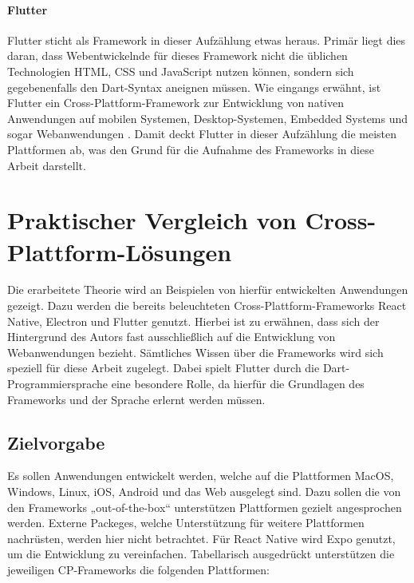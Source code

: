 \documentclass[a4paper]{scrartcl}
\begin{document}
\paragraph{Flutter}

Flutter sticht als Framework in dieser Aufzählung etwas heraus. Primär liegt dies daran, dass Webentwickelnde für dieses Framework nicht die üblichen Technologien HTML, CSS und JavaScript nutzen können, sondern sich gegebenenfalls den Dart-Syntax aneignen müssen. Wie eingangs erwähnt, ist Flutter ein Cross-Plattform-Framework zur Entwicklung von nativen Anwendungen auf mobilen Systemen, Desktop-Systemen, Embedded Systems und sogar Webanwendungen \autocite{Flutter}. Damit deckt Flutter in dieser Aufzählung die meisten Plattformen ab, was den Grund für die Aufnahme des Frameworks in diese Arbeit darstellt.

\newpage

\section{Praktischer Vergleich von Cross-Plattform-Lösungen}

Die erarbeitete Theorie wird an Beispielen von hierfür entwickelten Anwendungen gezeigt. Dazu werden die bereits beleuchteten Cross-Plattform-Frameworks React Native, Electron und Flutter genutzt. Hierbei ist zu erwähnen, dass sich der Hintergrund des Autors fast ausschließlich auf die Entwicklung von Webanwendungen bezieht. Sämtliches Wissen über die Frameworks wird sich speziell für diese Arbeit zugelegt. Dabei spielt Flutter durch die Dart-Programmiersprache eine besondere Rolle, da hierfür die Grundlagen des Frameworks und der Sprache erlernt werden müssen.

\subsection{Zielvorgabe}

Es sollen Anwendungen entwickelt werden, welche auf die Plattformen MacOS, Windows, Linux, iOS, Android und das Web ausgelegt sind. Dazu sollen die von den Frameworks „out-of-the-box“ unterstützen Plattformen gezielt angesprochen werden. Externe Packeges, welche Unterstützung für weitere Plattformen nachrüsten, werden hier nicht betrachtet. Für React Native wird Expo genutzt, um die Entwicklung zu vereinfachen. Tabellarisch ausgedrückt unterstützen die jeweiligen CP-Frameworks die folgenden Plattformen:
\end{document}
